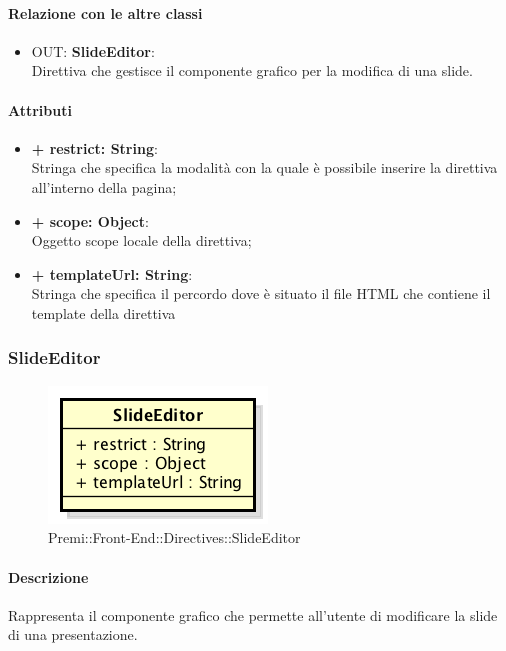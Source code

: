 	\paragraph{Relazione con le altre classi}
	\begin{itemize}
		\item OUT: \textbf{SlideEditor}:\\
		Direttiva che gestisce il componente grafico per la modifica di una \gls{slide}.
	\end{itemize}
	
	\paragraph{Attributi}
	\begin{itemize}
		\item \textbf{+ restrict: String}:\\
		Stringa che specifica la modalità con la quale è possibile inserire la direttiva all'interno della pagina;
		\item \textbf{+ scope: Object}:\\
		Oggetto scope locale della direttiva;
		\item \textbf{+ templateUrl: String}:\\
		Stringa che specifica il percordo dove è situato il file \gls{HTML} che contiene il \gls{template} della direttiva
	\end{itemize}
\newpage


\subsubsection{SlideEditor}
	\begin{figure}[h]
		\centering
		\includegraphics[width=0.5\linewidth]{img/premi_front_end_directives_slideeditor}
		\caption[Premi::Front-End::Directives::SlideEditor]{Premi::Front-End::Directives::SlideEditor}
	\end{figure}
	
	\paragraph{Descrizione}
	Rappresenta il componente grafico che permette all'utente di modificare la \gls{slide} di una presentazione.
	
